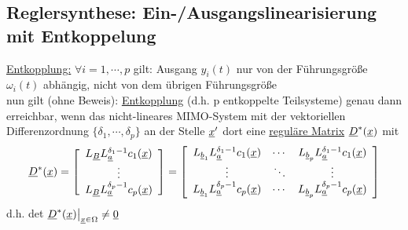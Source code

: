 \documentclass[openany,a4paper,11pt]{book}
\begin{document}
\subsection{Reglersynthese: Ein-/Ausgangslinearisierung mit Entkoppelung}
\uline{Entkopplung:} $\forall i=1,\cdots,p$ gilt: Ausgang $y_i(t)$ nur von der Führungsgröße $\omega_i(t)$ abhängig, nicht von dem übrigen Führungsgröße\\
nun gilt (ohne Beweis): \uline{Entkopplung} (d.h. p entkoppelte Teilsysteme) genau dann erreichbar, wenn das nicht-lineares MIMO-System mit der vektoriellen Differenzordnung $\{\delta_1,\cdots,\delta_p\}$ an der Stelle $\uline{x}'$ dort eine \uline{reguläre Matrix} $\uline{D}^*(\uline{x})$ mit
\[\uline{D}^*(\uline{x})
=\left[ \begin{array}{c} L_{\uline{B}}L_{\uline{a}}^{\delta_1-1}c_1(\uline{x})\\ \vdots\\ L_{\uline{B}}L_{\uline{a}}^{\delta_p-1}c_p(\uline{x})\\ \end{array} \right]
=\left[ \begin{array}{ccc} L_{\uline{b}_1}L_{\uline{a}}^{\delta_1-1}c_1(\uline{x})&\cdots&L_{\uline{b}_p}L_{\uline{a}}^{\delta_1-1}c_1(\uline{x})\\
\vdots&\ddots&\vdots\\
L_{\uline{b}_1}L_{\uline{a}}^{\delta_p-1}c_p(\uline{x})&\cdots&L_{\uline{b}_p}L_{\uline{a}}^{\delta_p-1}c_p(\uline{x})\\
\end{array} \right]\]
d.h. det $\uline{D}^*(\uline{x})\big|_{\uline{x} \in \Omega}\ne \uline{0}$ \\
\end{document}
